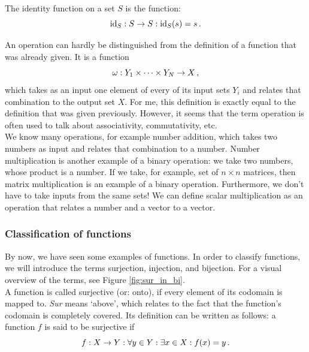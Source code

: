         The identity function on a set $S$ is the function:
        \begin{equation}
            \operatorname{id}_S: S \rightarrow S: \operatorname{id}_S(s) = s \thinspace .
        \end{equation}

        An operation can hardly be distinguished from the definition of a function that was already given. It is a function
        \begin{equation}
            \omega: Y_1 \times \cdots \times Y_N \rightarrow X \thinspace ,
        \end{equation}
        which takes as an input one element of every of its input sets $Y_i$ and relates that combination to the output set $X$. For me, this definition is exactly equal to the definition that was given previously. However, it seems that the term operation is often used to talk about associativity, commutativity, etc. \\

        We know many operations, for example number addition, which takes two numbers as input and relates that combination to a number. Number multiplication is another example of a binary operation: we take two numbers, whose product is a number. If we take, for example, set of $n \times n$ matrices, then matrix multiplication is an example of a binary operation. Furthermore, we don't have to take inputs from the same sets! We can define scalar multiplication as an operation that relates a number and a vector to a vector. \\


    \subsubsection{Classification of functions}
        By now, we have seen some examples of functions. In order to classify functions, we will introduce the terms surjection, injection, and bijection. For a visual overview of the terms, see Figure \ref{fig:sur_in_bi}. \\

        A function is called surjective (or: onto), if every element of its codomain is mapped to. \emph{Sur} means `above', which relates to the fact that the function's codomain is completely covered. Its definition can be written as follows: a function $f$ is said to be surjective if
        \begin{equation}
            f: X \rightarrow Y: \forall y \in Y: \exists x \in X: f(x) = y \thinspace .
        \end{equation}

